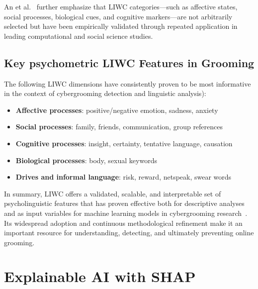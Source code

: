 An et al.~\cite{an2025cybergrooming} further emphasize that LIWC categories—such as affective states, social processes, biological cues, and cognitive markers—are not arbitrarily selected but have been empirically validated through repeated application in leading computational and social science studies. %


\subsection{Key psychometric LIWC Features in Grooming} \label{psychometric_liwc_features_in_grooming}
The following LIWC dimensions have consistently proven to be most informative in the context of cybergrooming detection and linguistic analysis\cite{gupta2012characterizingpedophileconversationsinternet,broome2020psycholinguistic,an2025cybergrooming}):
\begin{itemize}
    \item \textbf{Affective processes}: positive/negative emotion, sadness, anxiety
    \item \textbf{Social processes}: family, friends, communication, group references
    \item \textbf{Cognitive processes}: insight, certainty, tentative language, causation
    \item \textbf{Biological processes}: body, sexual keywords
    \item \textbf{Drives and informal language}: risk, reward, netspeak, swear words
\end{itemize} %

In summary, LIWC offers a validated, scalable, and interpretable set of psycholinguistic features that has proven  effective both for descriptive analyses and as input variables for machine learning models in cybergrooming research~\cite{an2025cybergrooming, gupta2012characterizingpedophileconversationsinternet, Cano2014, guo2023text,broome2020psycholinguistic}. Its widespread adoption and continuous methodological refinement make it an important resource for understanding, detecting, and ultimately preventing online grooming.

\section{Explainable AI with SHAP}

